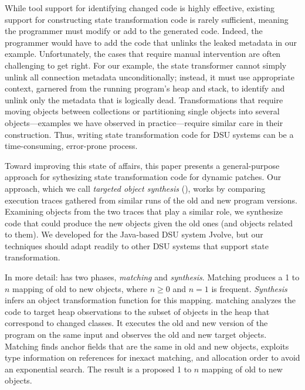 While tool support for identifying changed code is highly effective,
existing support for constructing state transformation code is rarely
sufficient, meaning the programmer must modify or add to the
generated code.  Indeed, the programmer would have to add the code that
unlinks the leaked metadata in our example.  Unfortunately, the cases
that require manual intervention are often challenging to get right.
For our example, the state transformer cannot simply unlink all
connection metadata unconditionally; instead, it must use appropriate
context, garnered from the running program's heap and stack, to
identify and unlink only the metadata that is logically dead.
Transformations that require moving objects between collections or
partitioning single objects into several objects---examples we have
observed in practice---require similar care in their construction.
Thus, writing state transformation code for DSU systems can be a
time-consuming, error-prone process.

Toward improving this state of affairs, this paper presents a
general-purpose approach for sythesizing state transformation code for
dynamic patches.  Our approach, which we call \emph{targeted object
  synthesis} (\TOS), works by comparing execution traces gathered from
similar runs of the old and new program versions.  Examining objects
from the two traces that play a similar role, we synthesize code that
could produce the new objects given the old ones (and objects related
to them).  We developed \TOS for the Java-based DSU system Jvolve, but
our techniques should adapt readily to other DSU systems that support state
transformation.


In more detail: \TOS has two phases, \emph{matching} and \emph{synthesis}.
Matching produces a 1 to $n$ mapping of old to new objects,
where $n \geq 0$ and $n=1$ is frequent.  \emph{Synthesis} infers an
object transformation function for this mapping.  \TOS matching
analyzes the code to target heap observations to the subset of objects
in the heap that correspond to changed classes. It executes the old
and new version of the program on the same input and observes the old
and new target objects. Matching finds anchor fields that are the
same in old and new objects, exploits type information on references
for inexact matching, and allocation order to avoid an exponential
search.  The result is a proposed 1 to $n$ mapping of old to new
objects.

